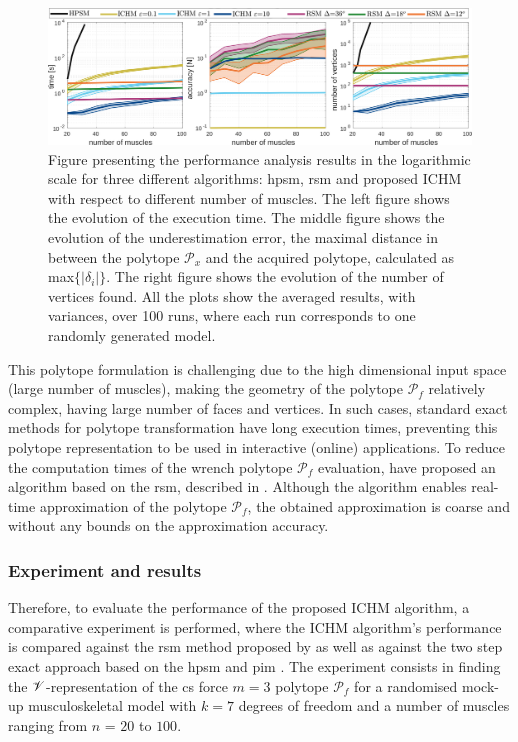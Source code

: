 \begin{figure}[!t]
    \centering
    \includegraphics[width=\linewidth]{Papers/images/one_auto_new5_these.png}
    \caption{{Figure presenting the performance analysis results in the logarithmic scale for three different algorithms: \gls{hpsm}, \gls{rsm} and proposed ICHM with respect to different number of muscles. The left figure shows the evolution of the execution time. The middle figure shows the evolution of the underestimation error, the maximal distance in between the polytope $\mathcal{P}_x$ and the acquired polytope, calculated as max$\{|\delta_{i}|\}$. The right figure shows the evolution of the number of vertices found. All the plots show the averaged results, with variances, over 100 runs, where each run corresponds to one randomly generated model.}}
    \label{fig:performance_results}
\end{figure}
This polytope formulation is challenging due to the high dimensional input space (large number of muscles), making the geometry of the polytope $\mathcal{P}_f$ relatively complex, having large number of faces and vertices. In such cases, standard exact methods for polytope transformation have long execution times, preventing this polytope representation to be used in interactive (online) applications. To reduce the computation times of the wrench polytope $\mathcal{P}_f$ evaluation, \citet{carmichael_towards_2011} have proposed an algorithm based on the \gls{rsm}, described in . Although the algorithm enables real-time approximation of the polytope $\mathcal{P}_f$, the obtained approximation is coarse and without any bounds on the approximation accuracy. 


\subsubsection{Experiment and results}
Therefore, to evaluate the performance of the proposed ICHM algorithm, a comparative experiment is
performed, where the ICHM algorithm's performance is compared against the \gls{rsm} method proposed by \citet{carmichael_towards_2011} as well as against the two step exact approach based on the \gls{hpsm} \cite{hyper_psm} and \gls{pim} \cite{bremner_fukuda_marzetta_1998}. The experiment consists in finding the $\mathscr{V}$-representation of the \gls{cs} force $m=3$ polytope $\mathcal{P}_f$ for a randomised mock-up musculoskeletal model with $k\!=\!7$ degrees of freedom and a number of muscles ranging from $n$ = $20$ to $100$. 

